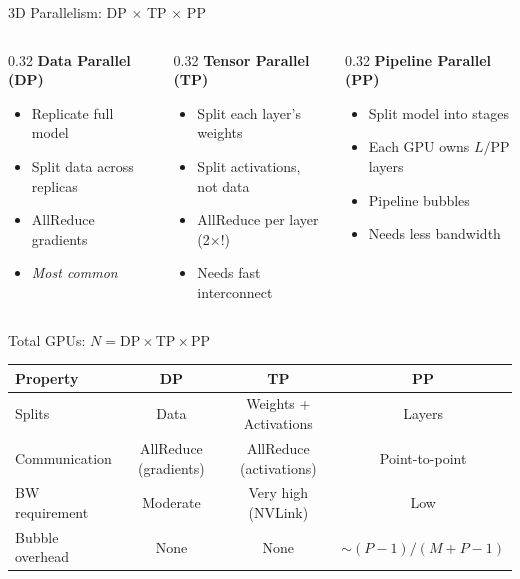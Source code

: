 \documentclass[aspectratio=169, 12pt]{beamer}
\begin{document}
\begin{frame}{3D Parallelism: DP $\times$ TP $\times$ PP}

\small
\begin{columns}[T]
\begin{column}{0.32\textwidth}
\textbf{Data Parallel (DP)}
\begin{itemize}\setlength\itemsep{1pt}\footnotesize
  \item Replicate full model
  \item Split data across replicas
  \item AllReduce gradients
  \item \textit{Most common}
\end{itemize}
\end{column}
\begin{column}{0.32\textwidth}
\textbf{Tensor Parallel (TP)}
\begin{itemize}\setlength\itemsep{1pt}\footnotesize
  \item Split each layer's weights
  \item Split activations, not data
  \item AllReduce per layer (2$\times$!)
  \item Needs fast interconnect
\end{itemize}
\end{column}
\begin{column}{0.32\textwidth}
\textbf{Pipeline Parallel (PP)}
\begin{itemize}\setlength\itemsep{1pt}\footnotesize
  \item Split model into stages
  \item Each GPU owns $L/\text{PP}$ layers
  \item Pipeline bubbles
  \item Needs less bandwidth
\end{itemize}
\end{column}
\end{columns}

\vspace{0.3cm}
Total GPUs: $N = \text{DP} \times \text{TP} \times \text{PP}$

\vspace{0.2cm}
\centering
\scriptsize
\begin{tabular}{lccc}
\toprule
\textbf{Property} & \textbf{DP} & \textbf{TP} & \textbf{PP} \\
\midrule
Splits & Data & Weights + Activations & Layers \\
Communication & AllReduce (gradients) & AllReduce (activations) & Point-to-point \\
BW requirement & Moderate & Very high (NVLink) & Low \\
Bubble overhead & None & None & $\sim(P{-}1)/(M{+}P{-}1)$ \\
\bottomrule
\end{tabular}
\end{frame}
\end{document}
